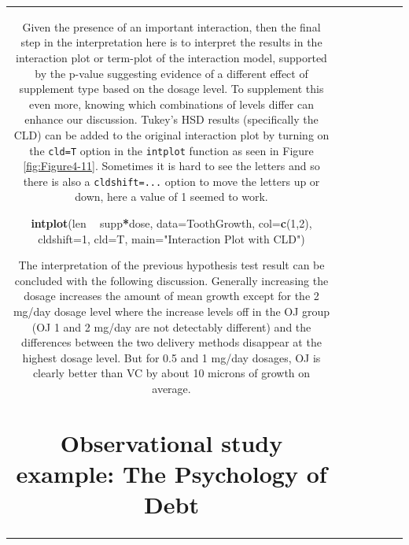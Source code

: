 \documentclass[]{book}
\newenvironment{Shaded}{\begin{snugshade}}{\end{snugshade}}
\newcommand{\KeywordTok}[1]{\textcolor[rgb]{0.13,0.29,0.53}{\textbf{#1}}}
\newcommand{\DataTypeTok}[1]{\textcolor[rgb]{0.13,0.29,0.53}{#1}}
\newcommand{\DecValTok}[1]{\textcolor[rgb]{0.00,0.00,0.81}{#1}}
\newcommand{\StringTok}[1]{\textcolor[rgb]{0.31,0.60,0.02}{#1}}
\newcommand{\OperatorTok}[1]{\textcolor[rgb]{0.81,0.36,0.00}{\textbf{#1}}}
\newcommand{\NormalTok}[1]{#1}
\theoremstyle{definition}
\theoremstyle{definition}
\theoremstyle{remark}
\begin{document}
\begin{longtable}[]{@{}ccccccc@{}}
\begin{minipage}[b]{0.10\columnwidth}
\begin{Shaded}
\begin{Highlighting}[]
\begin{Shaded}
\begin{Highlighting}[]
\begin{Shaded}
\begin{Highlighting}[]
Given the presence of an important interaction, then the final step in
the interpretation here is to interpret the results in the interaction
plot or term-plot of the interaction model, supported by the p-value
suggesting evidence of a different effect of supplement type based on
the dosage level. To supplement this even more, knowing which
combinations of levels differ can enhance our discussion. Tukey's HSD
results (specifically the CLD) can be added to the original interaction
plot by turning on the \texttt{cld=T} option in the \texttt{intplot}
function as seen in Figure \ref{fig:Figure4-11}. Sometimes it is hard to
see the letters and so there is also a \texttt{cldshift=...} option to
move the letters up or down, here a value of 1 seemed to work.

\begin{Shaded}
\begin{Highlighting}[]
\KeywordTok{intplot}\NormalTok{(len }\OperatorTok{~}\StringTok{ }\NormalTok{supp}\OperatorTok{*}\NormalTok{dose, }\DataTypeTok{data=}\NormalTok{ToothGrowth, }\DataTypeTok{col=}\KeywordTok{c}\NormalTok{(}\DecValTok{1}\NormalTok{,}\DecValTok{2}\NormalTok{), }\DataTypeTok{cldshift=}\DecValTok{1}\NormalTok{,}
        \DataTypeTok{cld=}\NormalTok{T, }\DataTypeTok{main=}\StringTok{"Interaction Plot with CLD"}\NormalTok{)}
\end{Highlighting}
\end{Shaded}

The interpretation of the previous hypothesis test result can be
concluded with the following discussion. Generally increasing the dosage
increases the amount of mean growth except for the 2 mg/day dosage level
where the increase levels off in the OJ group (OJ 1 and 2 mg/day are not
detectably different) and the differences between the two delivery
methods disappear at the highest dosage level. But for 0.5 and 1 mg/day
dosages, OJ is clearly better than VC by about 10 microns of growth on
average.

\section{Observational study example: The Psychology of
Debt}\label{section4-5}


\end{Highlighting}
\end{Shaded}
\end{Highlighting}
\end{Shaded}
\end{Highlighting}
\end{Shaded}
\end{minipage}
\end{longtable}
\end{document}
